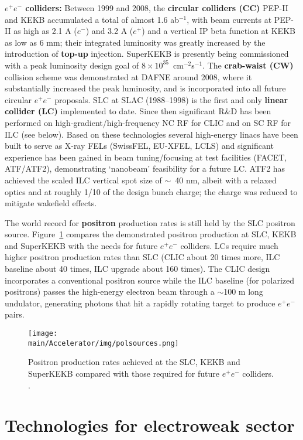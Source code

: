 {\bf $e^+e^-$ colliders:} Between 1999 and 2008, the {\bf circular colliders (CC)} PEP-II and KEKB accumulated a total of almost 1.6 ab$^{-1}$, with beam currents at PEP-II as high as 2.1 A ($e^-$) and 3.2 A ($e^+$) and a vertical IP beta function at KEKB as low as 6 mm; their integrated luminosity  was greatly increased by the introduction of {\bf top-up} injection. SuperKEKB is presently being commissioned with a peak luminosity design goal of 
$8\times 10^{35}$~cm$^{-2}$s$^{-1}$. The {\bf crab-waist (CW)} collision scheme was demonstrated at DAFNE around 2008, where it substantially increased the peak luminosity, and is incorporated into all 
future circular $e^+e^-$ proposals. SLC at SLAC (1988--1998) is the first and only {\bf linear collider (LC)} implemented to date.   Since then significant R\&D has been performed on  high-gradient/high-frequency NC RF for CLIC and on SC RF for ILC (see below). Based on these technologies several high-energy linacs have been built to serve as X-ray FELs (SwissFEL, EU-XFEL, LCLS) and significant experience has been gained in beam tuning/focusing at test facilities (FACET, ATF/ATF2), demonstrating `nanobeam' feasibility for a future LC. ATF2 has achieved the scaled ILC vertical spot size of $\sim$~40 nm, 
albeit with a relaxed optics and at roughly 1/10 of the design bunch charge; the charge was reduced to mitigate wakefield effects. 

The world record for {\bf positron} production rates is still held by the SLC positron source. Figure~\ref{polsources} compares the demonstrated positron production at SLC, KEKB and SuperKEKB with the needs for future $e^+e^-$ colliders\cite{benedikt-granada,zimmermann-pol}. 
LCs require much higher positron production rates than SLC (CLIC about 20 times more, ILC baseline about 40 times, ILC upgrade about 160 times). The CLIC design incorporates a conventional positron source while the ILC baseline (for polarized positrons) passes the high-energy electron beam through a $\sim$100 m long undulator, generating photons that hit a rapidly rotating target to produce $e^+e^-$  pairs.


\begin{figure}[ht]
\centering
\texttt{[image: \\main/Accelerator/img/polsources.png]}
\caption{Positron production rates achieved at the SLC, KEKB and SuperKEKB compared with those required for future $e^+e^-$ colliders. \label{polsources}.}
\end{figure}


\section{Technologies for electroweak sector} 

